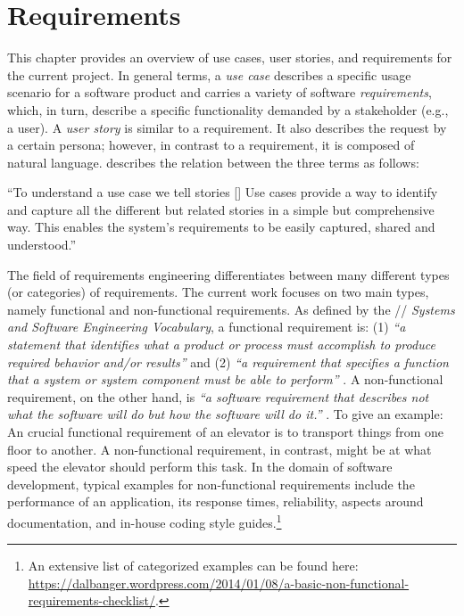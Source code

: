 \chapter{Requirements}\label{ch:Requirements}

\noindent This chapter provides an overview of use cases, user stories, and requirements for the current project. In general terms, a \textit{use case} describes a specific usage scenario for a software product and carries a variety of software \textit{requirements}, which, in turn, describe a specific functionality demanded by a stakeholder (e.g., a user). A \textit{user story} is similar to a requirement. It also describes the request by a certain persona; however, in contrast to a requirement, it is composed of natural language. \textcite[5]{Jacobson2011} describes the relation between the three terms as follows:

\begin{displayquote}
\hspace*{-1.4mm}``To understand a use case we tell stories [\textellipsis{}] Use cases provide a way to identify and capture all the different but related stories in a simple but comprehensive way. This enables the system’s requirements to be easily captured, shared and understood.''
\vspace*{1em}
\end{displayquote}

\noindent The field of requirements engineering differentiates between many different types (or categories) of requirements. The current work focuses on two main types, namely functional and non-functional requirements. As defined by the // \textit{Systems and Software Engineering Vocabulary}, a functional requirement is: (1) \textit{``a statement that identifies what a product or process must accomplish to produce required behavior and/or results''} and (2) \textit{``a requirement that specifies a function that a system or system component must be able to perform''} \parencite[see][301]{IEEEVocabulary}. A non-functional requirement, on the other hand, is \textit{``a software requirement that describes not what the software will do but how the software will do it.''} \parencite[see][231]{IEEEVocabulary}. To give an example: An crucial functional requirement of an elevator is to transport things from one floor to another. A non-functional requirement, in contrast, might be at what speed the elevator should perform this task. In the domain of software development, typical examples for non-functional requirements include the performance of an application, its response times, reliability, aspects around documentation, and in-house coding style guides.\footnote{An extensive list of categorized examples can be found here: \url{https://dalbanger.wordpress.com/2014/01/08/a-basic-non-functional-requirements-checklist/}.}

